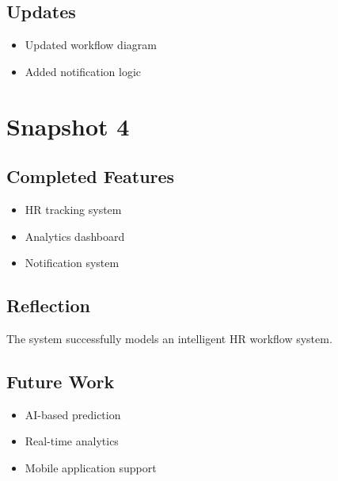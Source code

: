 \documentclass[12pt]{article}
\begin{document}
\subsection{Updates}
\begin{itemize}
    \item Updated workflow diagram
    \item Added notification logic
\end{itemize}

\section{Snapshot 4}

\subsection{Completed Features}
\begin{itemize}
    \item HR tracking system
    \item Analytics dashboard
    \item Notification system
\end{itemize}

\subsection{Reflection}
The system successfully models an intelligent HR workflow system.

\subsection{Future Work}
\begin{itemize}
    \item AI-based prediction
    \item Real-time analytics
    \item Mobile application support
\end{itemize}
\end{document}
